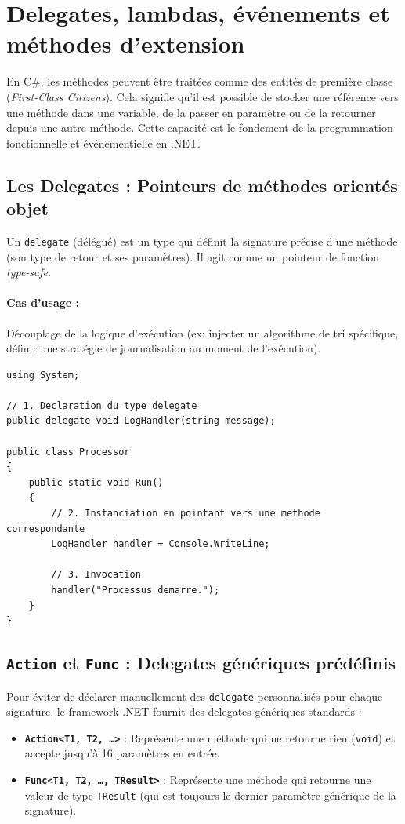 \section{Delegates, lambdas, événements et méthodes d'extension}

En C\#, les méthodes peuvent être traitées comme des entités de première classe (\textit{First-Class Citizens}). Cela signifie qu'il est possible de stocker une référence vers une méthode dans une variable, de la passer en paramètre ou de la retourner depuis une autre méthode. Cette capacité est le fondement de la programmation fonctionnelle et événementielle en .NET.

\subsection{Les Delegates : Pointeurs de méthodes orientés objet}

Un \texttt{delegate} (délégué) est un type qui définit la signature précise d'une méthode (son type de retour et ses paramètres). Il agit comme un pointeur de fonction \textit{type-safe}.

\paragraph{Cas d'usage :} Découplage de la logique d'exécution (ex: injecter un algorithme de tri spécifique, définir une stratégie de journalisation au moment de l'exécution).

\begin{lstlisting}[language={[Sharp]C}]
using System;

// 1. Declaration du type delegate
public delegate void LogHandler(string message);

public class Processor
{
    public static void Run()
    {
        // 2. Instanciation en pointant vers une methode correspondante
        LogHandler handler = Console.WriteLine;
        
        // 3. Invocation
        handler("Processus demarre.");
    }
}
\end{lstlisting}

\subsection{\texttt{Action} et \texttt{Func} : Delegates génériques prédéfinis}

Pour éviter de déclarer manuellement des \texttt{delegate} personnalisés pour chaque signature, le framework .NET fournit des delegates génériques standards :
\begin{itemize}
    \item \textbf{\texttt{Action<T1, T2, \dots>}} : Représente une méthode qui ne retourne rien (\texttt{void}) et accepte jusqu'à 16 paramètres en entrée.
    \item \textbf{\texttt{Func<T1, T2, \dots, TResult>}} : Représente une méthode qui retourne une valeur de type \texttt{TResult} (qui est toujours le dernier paramètre générique de la signature).
\end{itemize}

